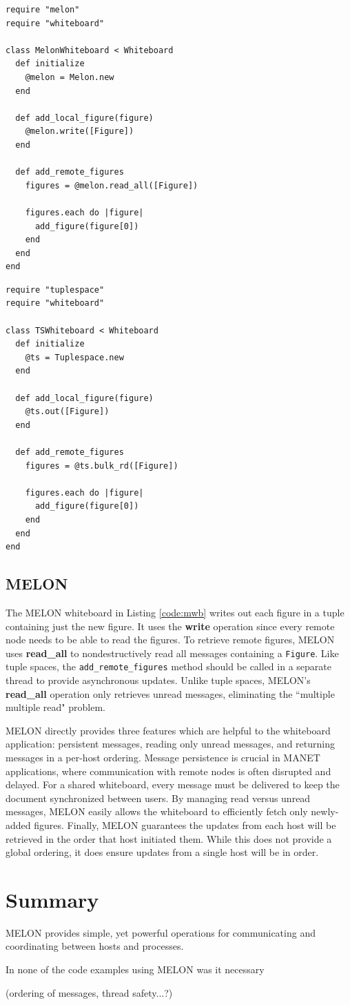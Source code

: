 \begin{lstlisting}[caption={MELON Whiteboard}, label={code:mwb}]
require "melon"
require "whiteboard"

class MelonWhiteboard < Whiteboard
  def initialize
    @melon = Melon.new
  end
  
  def add_local_figure(figure)
    @melon.write([Figure])
  end

  def add_remote_figures
    figures = @melon.read_all([Figure])

    figures.each do |figure|
      add_figure(figure[0])
    end
  end
end
\end{lstlisting}

\begin{lstlisting}[caption={Tuple Space Whiteboard}, label={code:tswb}]
require "tuplespace"
require "whiteboard"

class TSWhiteboard < Whiteboard
  def initialize
    @ts = Tuplespace.new
  end

  def add_local_figure(figure)
    @ts.out([Figure])
  end

  def add_remote_figures
    figures = @ts.bulk_rd([Figure])

    figures.each do |figure|
      add_figure(figure[0])
    end
  end
end 
\end{lstlisting}

\subsection{MELON}

The MELON whiteboard in Listing \ref{code:mwb} writes out each figure in a tuple containing just the new figure. It uses the \textbf{write} operation since every remote node needs to be able to read the figures. To retrieve remote figures, MELON uses \textbf{read\_all} to nondestructively read all messages containing a \texttt{Figure}. Like tuple spaces, the \texttt{add\_remote\_figures} method should be called in a separate thread to provide asynchronous updates. Unlike tuple spaces, MELON's \textbf{read\_all} operation only retrieves unread messages, eliminating the ``multiple multiple read" problem.

MELON directly provides three features which are helpful to the whiteboard application: persistent messages, reading only unread messages, and returning messages in a per-host ordering. Message persistence is crucial in MANET applications, where communication with remote nodes is often disrupted and delayed. For a shared whiteboard, every message must be delivered to keep the document synchronized between users. By managing read versus unread messages, MELON easily allows the whiteboard to efficiently fetch only newly-added figures. Finally, MELON guarantees the updates from each host will be retrieved in the order that host initiated them. While this does not provide a global ordering, it does ensure updates from a single host will be in order.

\section{Summary}

MELON provides simple, yet powerful operations for communicating and coordinating between hosts and processes.

In none of the code examples using MELON was it necessary 

(ordering of messages, thread safety...?)